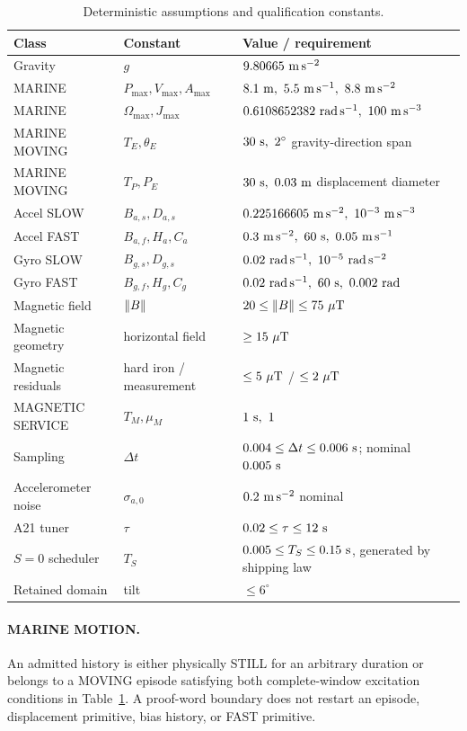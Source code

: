 \documentclass[journal]{IEEEtran}
\begin{document}
\begin{table}[t]
\centering\small
\caption{Deterministic assumptions and qualification constants.}
\label{tab:assumptions}
\begin{tabular}{@{}lll@{}}
\toprule
Class & Constant & Value / requirement\\
\midrule
Gravity & $g$ & $9.80665\ {\rm m\,s^{-2}}$\\
MARINE & $P_{\max},V_{\max},A_{\max}$ & $8.1\ {\rm m},\ 5.5\ {\rm m\,s^{-1}},\ 8.8\ {\rm m\,s^{-2}}$\\
MARINE & $\Omega_{\max},J_{\max}$ & $0.6108652382\ {\rm rad\,s^{-1}},\ 100\ {\rm m\,s^{-3}}$\\
MARINE MOVING & $T_E,\theta_E$ & $30\ {\rm s},\ 2^\circ$ gravity-direction span\\
MARINE MOVING & $T_P,P_E$ & $30\ {\rm s},\ 0.03\ {\rm m}$ displacement diameter\\
Accel SLOW & $B_{a,s},D_{a,s}$ & $0.225166605\ {\rm m\,s^{-2}},\ 10^{-3}\ {\rm m\,s^{-3}}$\\
Accel FAST & $B_{a,f},H_a,C_a$ & $0.3\ {\rm m\,s^{-2}},\ 60\ {\rm s},\ 0.05\ {\rm m\,s^{-1}}$\\
Gyro SLOW & $B_{g,s},D_{g,s}$ & $0.02\ {\rm rad\,s^{-1}},\ 10^{-5}\ {\rm rad\,s^{-2}}$\\
Gyro FAST & $B_{g,f},H_g,C_g$ & $0.02\ {\rm rad\,s^{-1}},\ 60\ {\rm s},\ 0.002\ {\rm rad}$\\
Magnetic field & $\left\lVert B\right\rVert$ & $20\le\left\lVert B\right\rVert\le75\ \mu{\rm T}$\\
Magnetic geometry & horizontal field & $\ge15\ \mu{\rm T}$\\
Magnetic residuals & hard iron / measurement & $\le5\ \mu{\rm T}$ / $\le2\ \mu{\rm T}$\\
MAGNETIC SERVICE & $T_M,\mu_M$ & $1\ {\rm s},\ 1$\\
Sampling & $\Delta t$ & $0.004\le\Delta t\le0.006\ {\rm s}$; nominal $0.005\ {\rm s}$\\
Accelerometer noise & $\sigma_{a,0}$ & $0.2\ {\rm m\,s^{-2}}$ nominal\\
A21 tuner & $\tau$ & $0.02\le\tau\le12\ {\rm s}$\\
$S=0$ scheduler & $T_S$ & $0.005\le T_S\le0.15\ {\rm s}$, generated by shipping law\\
Retained domain & tilt & $\le6^\circ$\\
\bottomrule
\end{tabular}
\end{table}

\paragraph{MARINE MOTION.}
An admitted history is either physically STILL for an arbitrary duration or
belongs to a MOVING episode satisfying both complete-window excitation
conditions in Table~\ref{tab:assumptions}.  A proof-word boundary does not
restart an episode, displacement primitive, bias history, or FAST primitive.
\end{document}
